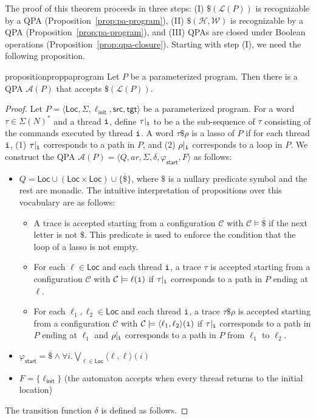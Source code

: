 \documentclass[9pt,nocopyrightspace]{sigplanconf}
\theoremstyle{definition}
\newcommand{\tuple}[1]{\langle #1 \rangle}
\newcommand{\Loc}{\textsf{Loc}}
\newcommand{\rankformulas}{\mathscr{W}}
\newcommand{\idx}[1]{\text{\rm\texttt{#1}}}
\newcommand{\src}{\textsf{src}}
\newcommand{\tgt}{\textsf{tgt}}
\newcommand{\init}{\textsf{init}}
\newcommand{\lang}{\mathcal{L}}
\newcommand{\start}{\mathsf{start}}
\renewcommand{\phi}{\varphi}
\newcommand{\config}{\mathcal{C}}
\newcommand{\ar}{\textit{ar}}
\newcommand{\iSigma}[1]{\Sigma(#1)}
\begin{document}
The proof of this theorem proceeds in three steps: (I) $\$(\lang(P))$ is
recognizable by a QPA (Proposition~\ref{prop:pa-program}), (II)
$\$(\mathscr{H},\rankformulas)$ is recognizable by a QPA
(Proposition~\ref{prop:pa-program}), and (III) QPAs are closed under Boolean
operations (Proposition~\ref{prop:qpa-closure}).  Starting with step (I), we need the following proposition.
\begin{restatable}{proposition}{proppaprogram}
  \label{prop:pa-program}
  Let $P$ be a parameterized program.  Then there is a QPA $\mathcal{A}(P)$
  that accepts $\$(\lang(P))$.
\end{restatable}
\begin{proof}
  Let $P = \tuple{\Loc,\Sigma,\ell_\init,\src,\tgt}$ be a parameterized
  program.  For a word $\tau \in \iSigma{N}^*$ and a thread $\idx{i}$, define $\tau|_{\idx{i}}$ to be a the sub-sequence of $\tau$
  consisting of the commands executed by thread $\idx{i}$.  A word
  $\tau\$\rho$ is a lasso of $P$ if for each thread $\idx{i}$, (1)
  $\tau|_{\idx{i}}$ corresponds to a path in $P$, and (2) $\rho|_{\idx{i}}$
  corresponds to a loop in $P$.  We construct the QPA $\mathcal{A}(P) =
  \tuple{Q,\ar,\Sigma,\delta,\phi_\start,F}$ as follows:
  \begin{itemize}
  \item $Q = \Loc \cup (\Loc \times \Loc) \cup \{ \overline{\$} \}$, where
    $\$$ is a nullary predicate symbol and the rest are monadic.  The
    intuitive interpretation of propositions over this vocabulary are as
    follows:
    \begin{itemize}
    \item A trace is accepted starting from a configuration $\config$ with $\config \models \overline{\$}$ if the next letter
      is not $\$$.  This predicate is used to enforce the condition that the
      loop of a lasso is not empty.
    \item For each $\ell \in \Loc$ and each thread $\idx{i}$, a trace $\tau$
      is accepted starting from a configuration $\config$ with $\config \models \ell(\idx{i})$ if $\tau|_{\idx{i}}$
      corresponds to a path in $P$ ending at $\ell$.
    \item For each $\ell_1,\ell_2 \in \Loc$ and each thread $\idx{i}$, a trace
      $\tau\$\rho$ is accepted starting from a configuration $\config$ with $\config \models \tuple{\ell_1,\ell_2}(\idx{i})$
      if $\tau|_{\idx{i}}$ corresponds to a path in $P$ ending at $\ell_1$ and
      $\rho|_{\idx{i}}$ corresponds to a path in $P$ from $\ell_1$ to
      $\ell_2$.
    \end{itemize}
  \item $\phi_\start = \overline{\$} \land \forall i. \bigvee_{\ell \in \Loc}
    \tuple{\ell,\ell}(i)$
  \item $F = \{ \ell_\init \}$ (the automaton accepts when every thread
    returns to the initial location)
  \end{itemize}
  The transition function $\delta$ is defined as follows.


\end{proof}
\end{document}
